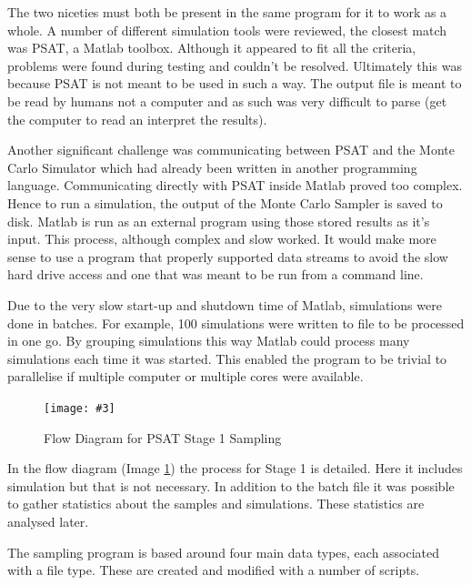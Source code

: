\documentclass[a4paper,oneside,12pt]{report}
\newcommand{\image}[3] {
  \begin{figure}
    \begin{center}
      \texttt{[image: \#3]}
      \caption{#2}
      \label{#1}
    \end{center}
  \end{figure}
}
\begin{document}
The two niceties must both be present in the same program for it to work as a whole. A number of different simulation tools were reviewed, the closest match was PSAT, a Matlab toolbox. Although it appeared to fit all the criteria, problems were found during testing and couldn't be resolved. Ultimately this was because PSAT is not meant to be used in such a way. The output file is meant to be read by humans not a computer and as such was very difficult to parse (get the computer to read an interpret the results). 

Another significant challenge was communicating between PSAT and the Monte Carlo Simulator which had already been written in another programming language. Communicating directly with PSAT inside Matlab proved too complex. Hence to run a simulation, the output of the Monte Carlo Sampler is saved to disk. Matlab is run as an external program using those stored results as it's input. This process, although complex and slow worked. It would make more sense to use a program that properly supported data streams to avoid the slow hard drive access and one that was meant to be run from a command line.

Due to the very slow start-up and shutdown time of Matlab, simulations were done in batches. For example, 100 simulations were written to file to be processed in one go. By grouping simulations this way Matlab could process many simulations each time it was started. This enabled the program to be trivial to parallelise if multiple computer or multiple cores were available.

\image{samplerflow}{Flow Diagram for PSAT Stage 1 Sampling}{samplerflow.png}

In the flow diagram (Image \ref{samplerflow}) the process for Stage 1 is detailed. Here it includes simulation but that is not necessary. In addition to the batch file it was possible to gather statistics about the samples and simulations. These statistics are analysed later.

The sampling program is based around four main data types, each associated with a file type. These are created and modified with a number of scripts.
\end{document}
